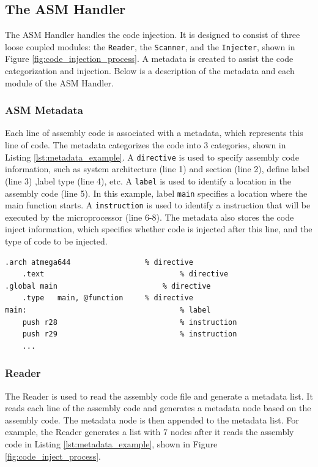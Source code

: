 \subsection{The ASM Handler}

The ASM Handler handles the code injection. It is designed to consist of three loose coupled modules: the \texttt{Reader}, the \texttt{Scanner}, and the \texttt{Injecter}, shown in Figure \ref{fig:code_injection_process}. A metadata is created to assist the code categorization and injection. Below is a description of the metadata and each module of the ASM Handler.

\subsubsection{ASM Metadata}

Each line of assembly code is associated with a metadata, which represents this line of code. The metadata categorizes the code into 3 categories, shown in Listing \ref{lst:metadata_example}. A \texttt{directive} is used to specify assembly code information, such as system architecture (line 1) and section (line 2), define label (line 3) ,label type (line 4), etc. A \texttt{label} is used to identify a location in the assembly code (line 5). In this example, label \texttt{main} specifies a location where the main function starts. A \texttt{instruction} is used to identify a instruction that will be executed by the microprocessor (line 6-8). The metadata also stores the code inject information, which specifies whether code is injected after this line, and the type of code to be injected.

\begin{lstlisting}[float=tb,label=lst:metadata_example,caption=Assembly Code Example]
.arch atmega644					% directive
	.text								% directive
.global	main						% directive
	.type	main, @function		% directive
main:									% label
	push r28							% instruction
	push r29							% instruction
	...
\end{lstlisting}

\subsubsection{Reader}

The Reader is used to read the assembly code file and generate a metadata list. It reads each line of the assembly code and generates a metadata node based on the assembly code. The metadata node is then appended to the metadata list. For example, the Reader generates a list with 7 nodes after it reads the assembly code in Listing \ref{lst:metadata_example}, shown in Figure \ref{fig:code_inject_process}.

